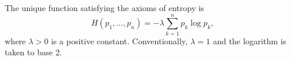 The unique function satisfying the axioms of entropy is
$$H(p_1, \dots, p_n) = -\lambda \sum_{k=1}^{n} p_k \log p_k,$$
where $\lambda > 0$ is a positive constant. Conventionally, $\lambda = 1$ and the logarithm is taken to base 2.
